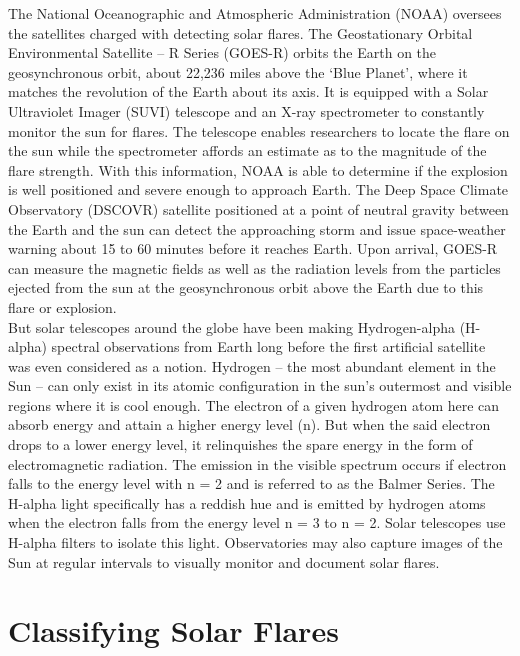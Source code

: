 \documentclass[12pt,twoside]{reedthesis}
\begin{document}
The National Oceanographic and Atmospheric Administration (NOAA) oversees the satellites charged with detecting solar flares. The Geostationary Orbital Environmental Satellite – R Series (GOES-R) orbits the Earth on the geosynchronous orbit, about 22,236 miles above the ‘Blue Planet’, where it matches the revolution of the Earth about its axis. It is equipped with a Solar Ultraviolet Imager (SUVI) telescope and an X-ray spectrometer to constantly monitor the sun for flares. The telescope enables researchers to locate the flare on the sun while the spectrometer affords an estimate as to the magnitude of the flare strength. With this information, NOAA is able to determine if the explosion is well positioned and severe enough to approach Earth. The Deep Space Climate Observatory (DSCOVR) satellite positioned at a point of neutral gravity between the Earth and the sun can detect the approaching storm and issue space-weather warning about 15 to 60 minutes before it reaches Earth. Upon arrival, GOES-R can measure the magnetic fields as well as the radiation levels from the particles ejected from the sun at the geosynchronous orbit above the Earth due to this flare or explosion.\\

But solar telescopes around the globe have been making Hydrogen-alpha (H-alpha) spectral observations from Earth long before the first artificial satellite was even considered as a notion.  Hydrogen – the most abundant element in the Sun – can only exist in its atomic configuration in the sun’s outermost and visible regions where it is cool enough. The electron of a given hydrogen atom here can absorb energy and attain a higher energy level (n). But when the said electron drops to a lower energy level, it relinquishes the spare energy in the form of electromagnetic radiation. The emission in the visible spectrum occurs if electron falls to the energy level with n = 2 and is referred to as the Balmer Series. The H-alpha light specifically has a reddish hue and is emitted by hydrogen atoms when the electron falls from the energy level n = 3 to n = 2. Solar telescopes use H-alpha filters to isolate this light. Observatories may also capture images of the Sun at regular intervals to visually monitor and document solar flares. \\


\section{Classifying Solar Flares} 
\end{document}
